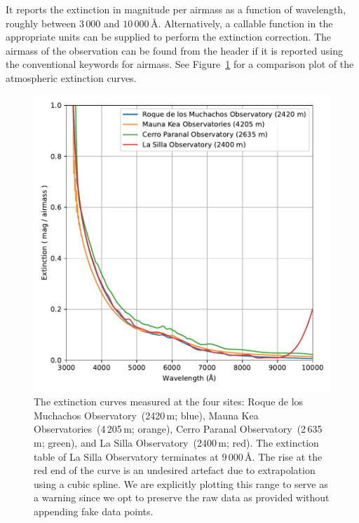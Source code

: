 \documentclass[linenumbers, twocolumn]{aastex631}
\begin{document}
It reports the extinction in magnitude per airmass as a function of wavelength,
roughly between $3\,000$ and $10\,000$\,\AA. Alternatively, a callable function
in the appropriate units can be supplied to perform the extinction correction.
The airmass of the observation can be found from the header if it is reported
using the conventional keywords for airmass. See Figure~\ref{fig:extinction}
for a comparison plot of the atmospheric extinction curves.

\begin{figure}
    \centering
    \includegraphics[width=\columnwidth]{fig_07_extinction_curves.pdf}
    \caption{The extinction curves measured at the four sites: Roque de los
    Muchachos Observatory~(2420\,m; blue), Mauna Kea Observatories~(4\,205\,m;
    orange), Cerro Paranal Observatory~(2\,635\,m; green), and La Silla
    Observatory~(2400\,m; red). The extinction table of La Silla Observatory
    terminates at $9\,000$\,\AA. The rise at the red end of the curve is an
    undesired artefact due to extrapolation using a cubic spline. We are
    explicitly plotting this range to serve as a warning since we opt to
    preserve the raw data as provided without appending fake data points.}
    \label{fig:extinction}
\end{figure}

\end{document}
